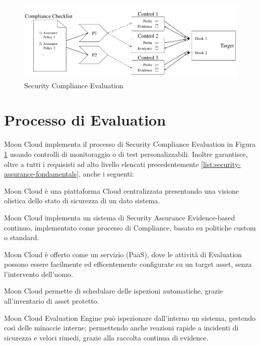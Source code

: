 \begin{figure}
	\includegraphics[scale=0.5]{images/Security_Compliance_Evaluation.png}
	\caption{Security Compliance Evaluation}
	\label{fig:Security_Compliance_Evaluation}
\end{figure}

\newpage

\section{Processo di Evaluation}
Moon Cloud implementa il processo di Security Compliance Evaluation in Figura \ref{fig:Security_Compliance_Evaluation} usando controlli 
di monitoraggio o di test personalizzabili. Inoltre garantisce, oltre a tutti i requisisti ad alto livello elencati precedentemente 
\ref{list:security-assurance-fondamentals}, anche i seguenti:
\begin{description}
	\item Moon Cloud è una piattaforma Cloud centralizzata presentando una visione olistica dello stato di sicurezza di un dato sistema.
	\item Moon Cloud implementa un sistema di Security Assurance Evidence-based continuo, implementato come processo di Compliance,
	basato su politiche custom o standard.
	\item Moon Cloud è offerto come un servizio (PaaS), dove le attività di Evaluation possono essere facilmente ed efficentemente 
	configurate su un target asset, senza l'intervento dell'uomo.
	\item Moon Cloud permette di schedulare delle ispezioni automatiche, grazie all'inventario di asset protetto.
	\item Moon Cloud Evaluation Engine può ispezionare dall'interno un sistema, gestendo così delle minaccie interne; permettendo anche 
	reazioni rapide a incidenti di sicurezza e veloci rimedi, grazie alla raccolta continua di evidence. 
\end{description}



